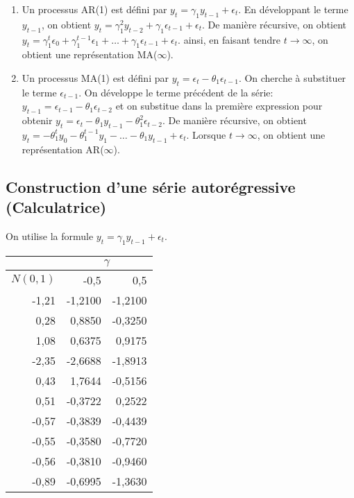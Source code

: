 \documentclass{article}
\begin{document}
\begin{enumerate}
\item Un processus AR(1) est défini par $y_t = \gamma_1y_{t-1} + \epsilon_t$. En développant le terme $y_{t-1}$, on obtient $y_t = \gamma_1^2y_{t-2}+\gamma_1\epsilon_{t-1}+\epsilon_t$. De manière récursive, on obtient $y_t = \gamma_1^{t}\epsilon_0 + \gamma_1^{t-1}\epsilon_1 + \ldots + \gamma_1\epsilon_{t-1} + \epsilon_t$. ainsi, en faisant tendre $t\to\infty$, on obtient une représentation MA($\infty$).
  
\item Un processus MA(1) est défini par $y_t = \epsilon_t - \theta_1\epsilon_{t-1}$. On cherche à substituer le terme $\epsilon_{t-1}$. On développe le terme précédent de la série: $y_{t-1} = \epsilon_{t-1} - \theta_1\epsilon_{t-2}$ et on substitue dans la première expression pour obtenir $y_t = \epsilon_t - \theta_1y_{t-1} - \theta_1^2\epsilon_{t-2}$. De manière récursive, on obtient $y_t = -\theta_1^ty_0-\theta_1^{t-1}y_1-\ldots-\theta_1y_{t-1}+\epsilon_{t}$. Lorsque $t\to\infty$, on obtient une représentation AR($\infty$).
\end{enumerate}


\clearpage
\subsection{Construction d'une série autorégressive (Calculatrice)}

On utilise la formule $y_t = \gamma_1y_{t-1} + \epsilon_t$.

\begin{center}
\begin{tabular}{|r|r|r|}
\hline
\multicolumn{1}{|l|}{} & \multicolumn{ 2}{c|}{$\gamma$} \\ \hline
\multicolumn{1}{|l|}{$N(0,1)$} & -0,5 & 0,5 \\ \hline
-1,21 & -1,2100 & -1,2100 \\ \hline
0,28 & 0,8850 & -0,3250 \\ \hline
1,08 & 0,6375 & 0,9175 \\ \hline
-2,35 & -2,6688 & -1,8913 \\ \hline
0,43 & 1,7644 & -0,5156 \\ \hline
0,51 & -0,3722 & 0,2522 \\ \hline
-0,57 & -0,3839 & -0,4439 \\ \hline
-0,55 & -0,3580 & -0,7720 \\ \hline
-0,56 & -0,3810 & -0,9460 \\ \hline
-0,89 & -0,6995 & -1,3630 \\ \hline
\end{tabular}
\end{center}
\end{document}
